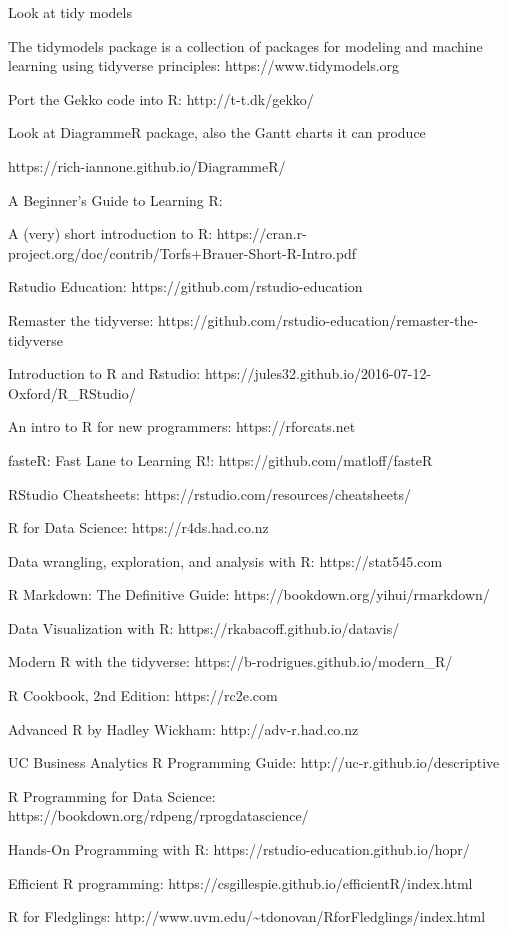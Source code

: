 \documentclass[
  letterpaper,
  DIV=11,
  numbers=noendperiod]{scrreport}
\begin{document}
Look at tidy models

The tidymodels package is a collection of packages for modeling and
machine learning using tidyverse principles: https://www.tidymodels.org

Port the Gekko code into R: http://t-t.dk/gekko/

Look at DiagrammeR package, also the Gantt charts it can produce

https://rich-iannone.github.io/DiagrammeR/

A Beginner's Guide to Learning R:

A (very) short introduction to R:
https://cran.r-project.org/doc/contrib/Torfs+Brauer-Short-R-Intro.pdf

Rstudio Education: https://github.com/rstudio-education

Remaster the tidyverse:
https://github.com/rstudio-education/remaster-the-tidyverse

Introduction to R and Rstudio:
https://jules32.github.io/2016-07-12-Oxford/R\_RStudio/

An intro to R for new programmers: https://rforcats.net

fasteR: Fast Lane to Learning R!: https://github.com/matloff/fasteR

RStudio Cheatsheets: https://rstudio.com/resources/cheatsheets/

R for Data Science: https://r4ds.had.co.nz

Data wrangling, exploration, and analysis with R: https://stat545.com

R Markdown: The Definitive Guide: https://bookdown.org/yihui/rmarkdown/

Data Visualization with R: https://rkabacoff.github.io/datavis/

Modern R with the tidyverse: https://b-rodrigues.github.io/modern\_R/

R Cookbook, 2nd Edition: https://rc2e.com

Advanced R by Hadley Wickham: http://adv-r.had.co.nz

UC Business Analytics R Programming Guide:
http://uc-r.github.io/descriptive

R Programming for Data Science:
https://bookdown.org/rdpeng/rprogdatascience/

Hands-On Programming with R: https://rstudio-education.github.io/hopr/

Efficient R programming:
https://csgillespie.github.io/efficientR/index.html

R for Fledglings:
http://www.uvm.edu/\textasciitilde tdonovan/RforFledglings/index.html
\end{document}
